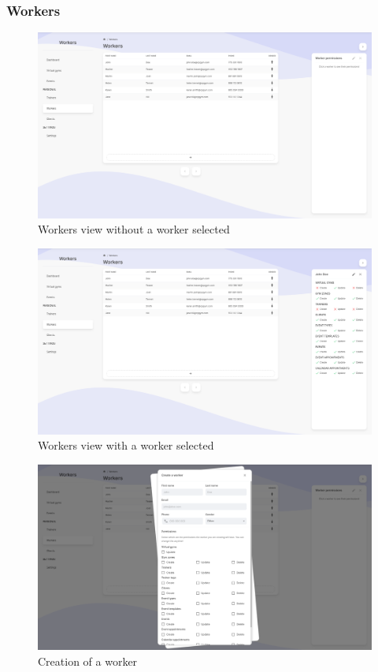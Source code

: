 \documentclass[a4paper, 12pt, oneside]{book}
\begin{document}
\subsubsection{Workers}
\begin{figure}[H]
	\centering
	\includegraphics[width=\textwidth]{assets/core-screenshots/workers.png}
	\caption{Workers view without a worker selected}
\end{figure}
\begin{figure}[H]
	\centering
	\includegraphics[width=\textwidth]{assets/core-screenshots/workers-selected.png}
	\caption{Workers view with a worker selected}
\end{figure}
\begin{figure}[H]
	\centering
	\includegraphics[width=\textwidth]{assets/core-screenshots/create-worker.png}
	\caption{Creation of a worker}
\end{figure}
\end{document}
